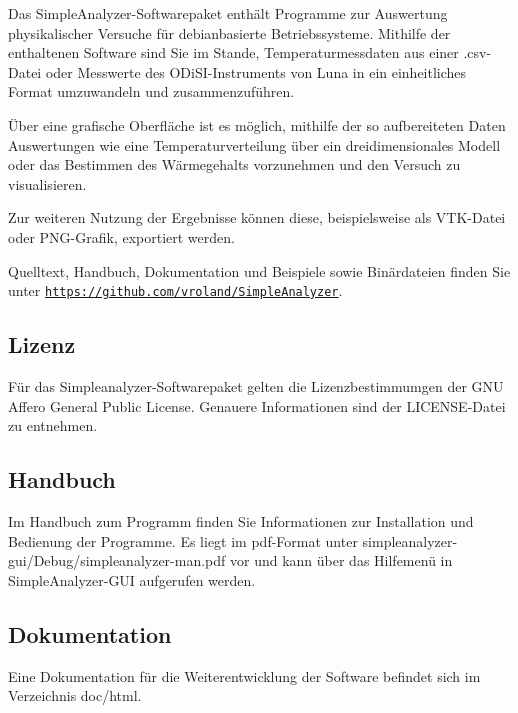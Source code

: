 Das Simple\-Analyzer-\/\-Softwarepaket enthält Programme zur Auswertung physikalischer Versuche für debianbasierte Betriebssysteme. Mithilfe der enthaltenen Software sind Sie im Stande, Temperaturmessdaten aus einer .csv-\/\-Datei oder Messwerte des O\-Di\-S\-I-\/\-Instruments von Luna in ein einheitliches Format umzuwandeln und zusammenzuführen.

Über eine grafische Oberfläche ist es möglich, mithilfe der so aufbereiteten Daten Auswertungen wie eine Temperaturverteilung über ein dreidimensionales Modell oder das Bestimmen des Wärmegehalts vorzunehmen und den Versuch zu visualisieren.

Zur weiteren Nutzung der Ergebnisse können diese, beispielsweise als V\-T\-K-\/\-Datei oder P\-N\-G-\/\-Grafik, exportiert werden.

Quelltext, Handbuch, Dokumentation und Beispiele sowie Binärdateien finden Sie unter \href{https://github.com/vroland/SimpleAnalyzer}{\tt https\-://github.\-com/vroland/\-Simple\-Analyzer}.

\subsection*{Lizenz }

Für das Simpleanalyzer-\/\-Softwarepaket gelten die Lizenzbestimmumgen der G\-N\-U Affero General Public License. Genauere Informationen sind der L\-I\-C\-E\-N\-S\-E-\/\-Datei zu entnehmen.

\subsection*{Handbuch }

Im Handbuch zum Programm finden Sie Informationen zur Installation und Bedienung der Programme. Es liegt im pdf-\/\-Format unter simpleanalyzer-\/gui/\-Debug/simpleanalyzer-\/man.\-pdf vor und kann über das Hilfemenü in Simple\-Analyzer-\/\-G\-U\-I aufgerufen werden.

\subsection*{Dokumentation }

Eine Dokumentation für die Weiterentwicklung der Software befindet sich im Verzeichnis doc/html. 